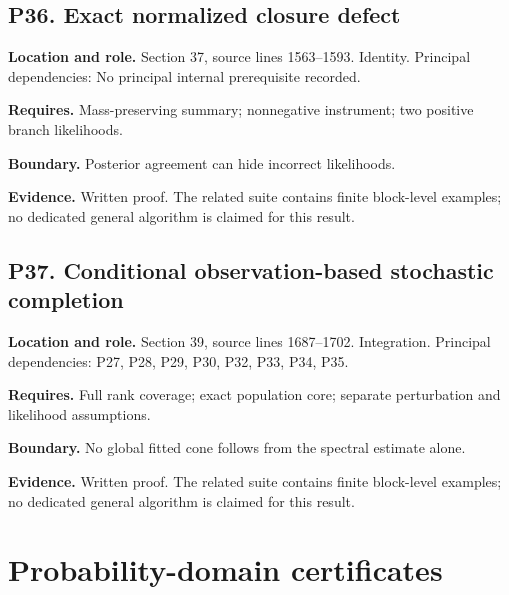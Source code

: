 \documentclass[11pt,letterpaper]{article}
\begin{document}
\par\noindent\begin{minipage}{\textwidth}
\subsection{P36. Exact normalized closure
defect}\label{p36.-exact-normalized-closure-defect}

\textbf{Location and role.} Section 37, source lines 1563--1593.
Identity. Principal dependencies: No principal internal prerequisite
recorded.

\textbf{Requires.} Mass-preserving summary; nonnegative instrument; two
positive branch likelihoods.

\textbf{Boundary.} Posterior agreement can hide incorrect likelihoods.

\textbf{Evidence.} Written proof. The related suite contains finite
block-level examples; no dedicated general algorithm is claimed for this
result.
\end{minipage}\par\medskip

\par\noindent\begin{minipage}{\textwidth}
\subsection{P37. Conditional observation-based stochastic
completion}\label{p37.-conditional-observation-based-stochastic-completion}

\textbf{Location and role.} Section 39, source lines 1687--1702.
Integration. Principal dependencies: P27, P28, P29, P30, P32, P33, P34,
P35.

\textbf{Requires.} Full rank coverage; exact population core; separate
perturbation and likelihood assumptions.

\textbf{Boundary.} No global fitted cone follows from the spectral
estimate alone.

\textbf{Evidence.} Written proof. The related suite contains finite
block-level examples; no dedicated general algorithm is claimed for this
result.
\end{minipage}\par\medskip

\newpage

\section{Probability-domain
certificates}\label{probability-domain-certificates}
\end{document}
